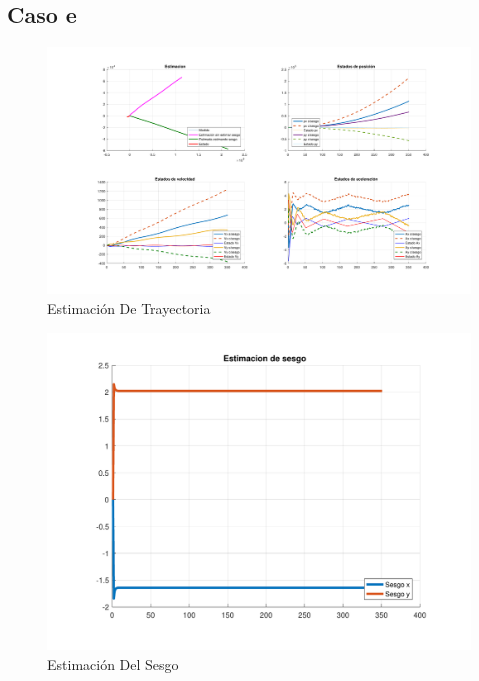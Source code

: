 \subsection{Caso e}

	\begin{figure}[H]
		\centering
		\includegraphics[width=1.0\textwidth,keepaspectratio]{Figuras/graf_ej4e.pdf}
		\caption{Estimación De Trayectoria}
		\label{fig:ej4e}
	\end{figure}
	
	\begin{figure}[H]
		\centering
		\includegraphics[width=1.0\textwidth,keepaspectratio]{Figuras/bias_ej4e.pdf}
		\caption{Estimación Del Sesgo}
		\label{fig:ej4e_bias}
	\end{figure}
	
